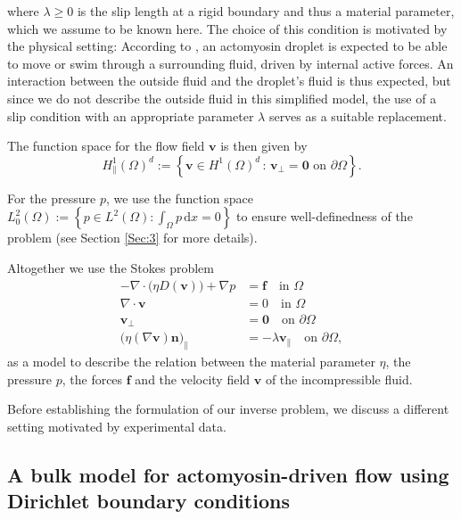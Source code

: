 \documentclass[final,leqno]{scrarticle}
\newcommand{\dd}{\, \mathrm{d}}
\begin{document}
where $\lambda \geq 0$ is the slip length at a rigid boundary and thus a material parameter, which we assume to be known here. The choice of this condition is motivated by the physical setting: According to \cite{KreeZippelius18}, an actomyosin droplet is expected to be able to move or swim through a surrounding fluid, driven by internal active forces. An interaction between the outside fluid and the droplet's fluid is thus expected, but since we do not describe the outside fluid in this simplified model, the use of a slip condition with an appropriate parameter $\lambda$ serves as a suitable replacement. 

The function space for the flow field $\mathbf{v}$ is then given by 
\begin{displaymath}
 H^1_{\parallel}(\Omega)^d := \left\lbrace \mathbf{v} \in H^{1}(\Omega)^{d} \, : \, \mathbf{v}_{\bot} = \mathbf{0} \text{ on } \partial \Omega \right\rbrace .
\end{displaymath}

For the pressure $p$, we use the function space $
 L^2_0(\Omega) :=  \left\lbrace p \in L^2(\Omega) : \int_{\Omega} p \dd x = 0 \right\rbrace
$
to ensure well-definedness of the problem (see Section \ref{Sec:3} for more details).

Altogether we use the Stokes problem
\begin{equation} \label{eq:stokes_problem}
 \begin{split}
  -\nabla \cdot \big( \eta D(\mathbf{v}) \big) + \nabla p &=  \mathbf{f} \quad \text{in } \Omega\\
  \nabla \cdot \mathbf{v} &= 0 \quad \text{in } \Omega\\
  \mathbf{v}_{\bot} &= \mathbf{0} \quad \text{on } \partial\Omega \\
  \big(\eta (\nabla \mathbf{v})\mathbf{n} \big)_{\parallel} &= -\lambda \mathbf{v}_{\parallel}\quad \text{on } \partial\Omega,
 \end{split}
\end{equation}
as a model to describe the relation between the material parameter $\eta$, the pressure $p$, the forces $\mathbf{f}$ and the velocity field $\mathbf{v}$ of the incompressible fluid. 

Before establishing the formulation of our inverse problem, we discuss a different setting motivated by experimental data. 

\subsection{A bulk model for actomyosin-driven flow using Dirichlet boundary conditions\label{sec:bulk}}
\end{document}
